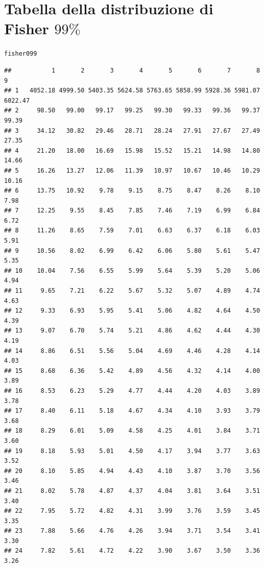 \documentclass[onecolumn,12pt]{book}\usepackage[]{graphicx}\usepackage[]{color}
\makeatletter
\newcommand{\hlstd}[1]{\textcolor[rgb]{0.345,0.345,0.345}{#1}}%
\newenvironment{kframe}{%
 \def\at@end@of@kframe{}%
 \ifinner\ifhmode%
  \def\at@end@of@kframe{\end{minipage}}%
  \begin{minipage}{\columnwidth}%
 \fi\fi%
 \def\FrameCommand##1{\hskip\@totalleftmargin \hskip-\fboxsep
 \colorbox{shadecolor}{##1}\hskip-\fboxsep
     \hskip-\linewidth \hskip-\@totalleftmargin \hskip\columnwidth}%
 \MakeFramed {\advance\hsize-\width
   \@totalleftmargin\z@ \linewidth\hsize
   \@setminipage}}%
 {\par\unskip\endMakeFramed%
 \at@end@of@kframe}
\newenvironment{knitrout}{}{} %
\makeatother
\begin{document}
\section*{Tabella della distribuzione di Fisher $99\%$}
\oddsidemargin 0.0in
\evensidemargin 0.0in
\topmargin -0.4in
\begin{knitrout}
\color{fgcolor}\begin{kframe}
\begin{alltt}
\hlstd{fisher099}
\end{alltt}
\begin{verbatim}
##           1       2       3       4       5       6       7       8       9
## 1   4052.18 4999.50 5403.35 5624.58 5763.65 5858.99 5928.36 5981.07 6022.47
## 2     98.50   99.00   99.17   99.25   99.30   99.33   99.36   99.37   99.39
## 3     34.12   30.82   29.46   28.71   28.24   27.91   27.67   27.49   27.35
## 4     21.20   18.00   16.69   15.98   15.52   15.21   14.98   14.80   14.66
## 5     16.26   13.27   12.06   11.39   10.97   10.67   10.46   10.29   10.16
## 6     13.75   10.92    9.78    9.15    8.75    8.47    8.26    8.10    7.98
## 7     12.25    9.55    8.45    7.85    7.46    7.19    6.99    6.84    6.72
## 8     11.26    8.65    7.59    7.01    6.63    6.37    6.18    6.03    5.91
## 9     10.56    8.02    6.99    6.42    6.06    5.80    5.61    5.47    5.35
## 10    10.04    7.56    6.55    5.99    5.64    5.39    5.20    5.06    4.94
## 11     9.65    7.21    6.22    5.67    5.32    5.07    4.89    4.74    4.63
## 12     9.33    6.93    5.95    5.41    5.06    4.82    4.64    4.50    4.39
## 13     9.07    6.70    5.74    5.21    4.86    4.62    4.44    4.30    4.19
## 14     8.86    6.51    5.56    5.04    4.69    4.46    4.28    4.14    4.03
## 15     8.68    6.36    5.42    4.89    4.56    4.32    4.14    4.00    3.89
## 16     8.53    6.23    5.29    4.77    4.44    4.20    4.03    3.89    3.78
## 17     8.40    6.11    5.18    4.67    4.34    4.10    3.93    3.79    3.68
## 18     8.29    6.01    5.09    4.58    4.25    4.01    3.84    3.71    3.60
## 19     8.18    5.93    5.01    4.50    4.17    3.94    3.77    3.63    3.52
## 20     8.10    5.85    4.94    4.43    4.10    3.87    3.70    3.56    3.46
## 21     8.02    5.78    4.87    4.37    4.04    3.81    3.64    3.51    3.40
## 22     7.95    5.72    4.82    4.31    3.99    3.76    3.59    3.45    3.35
## 23     7.88    5.66    4.76    4.26    3.94    3.71    3.54    3.41    3.30
## 24     7.82    5.61    4.72    4.22    3.90    3.67    3.50    3.36    3.26

\end{verbatim}
\end{kframe}
\end{knitrout}
\end{document}
